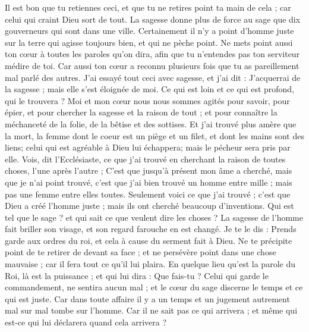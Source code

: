 \begin{multicols}{2}
Il est bon que tu retiennes ceci, et que tu ne retires point ta main de cela ; car celui qui craint Dieu sort de tout.
La sagesse donne plus de force au sage que dix gouverneurs qui sont dans une ville.
Certainement il n'y a point d'homme juste sur la terre qui agisse toujours bien, et qui ne pèche point.
Ne mets point aussi ton cœur à toutes les paroles qu'on dira, afin que tu n'entendes pas ton serviteur médire de toi. 
Car aussi ton cœur a reconnu plusieurs fois que tu as pareillement mal parlé des autres. 
J'ai essayé tout ceci avec sagesse, et j'ai dit : J'acquerrai de la sagesse ; mais elle s'est éloignée de moi. 
Ce qui est loin et ce qui est profond, qui le trouvera ?
Moi et mon cœur nous nous sommes agités pour savoir, pour épier, et pour chercher la sagesse et la raison de tout ; et pour connaître la méchanceté de la folie, de la bêtise et des sottises. 
Et j'ai trouvé plus amère que la mort, la femme dont le coeur est un piège et un filet, et dont les mains sont des liens; celui qui est agréable à Dieu lui échappera; mais le pécheur sera pris par elle.
Vois, dit l'Ecclésiaste, ce que j'ai trouvé en cherchant la raison de toutes choses, l'une après l'autre ;
C'est que jusqu'à présent mon âme a cherché, mais que je n'ai point trouvé, c'est que j'ai bien trouvé un homme entre mille ; mais pas une femme entre elles toutes. 
Seulement voici ce que j'ai trouvé ; c'est que Dieu a créé l'homme juste ; mais ils ont cherché beaucoup d'inventions.
\VerseOne{}Qui est tel que le sage ? et qui sait ce que veulent dire les choses ? La sagesse de l'homme fait briller son visage, et son regard farouche en est changé.
Je te le dis : Prends garde aux ordres du roi, et cela à cause du serment fait à Dieu.
Ne te précipite point de te retirer de devant sa face ; et ne persévère point dans une chose mauvaise ; car il fera tout ce qu'il lui plaira. 
En quelque lieu qu'est la parole du Roi, là est la puissance ; et qui lui dira : Que fais-tu ? 
Celui qui garde le commandement, ne sentira aucun mal ; et le cœur du sage discerne le temps et ce qui est juste. 
Car dans toute affaire il y a un temps et un jugement autrement mal sur mal tombe sur l'homme. 
Car il ne sait pas ce qui arrivera ; et même qui est-ce qui lui déclarera quand cela arrivera ? 

\end{multicols}
